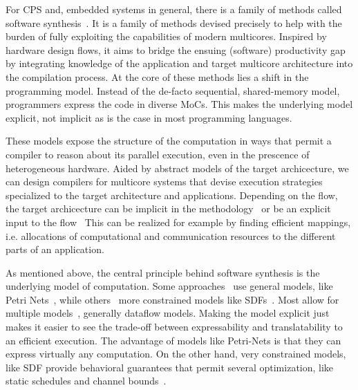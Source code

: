 For \ac{CPS} and, embedded systems in general, there is a family of methods called software synthesis~\cite{ritz1992softwaresynthesis,abbott1993softwaresynthesis,lin1998softwaresynthesis,bhartacharyya2000softwaresynthesis,pino1995softwaresynthesis,castrillon2011trends,bhattacharyya2012softwaresynthesis}.
It is a family of methods devised precisely to help with the burden of fully exploiting the capabilities of modern multicores.
Inspired by hardware design flows, it aims to bridge the ensuing (software) productivity gap by integrating knowledge of the application and target multicore architecture into the compilation process.
At the core of these methods lies a shift in the programming model.
Instead of the de-facto sequential, shared-memory model, programmers express the code in diverse \acp{MoC}.
This makes the underlying model explicit, not implicit as is the case in most programming languages.

These models expose the structure of the computation in ways that permit a compiler to reason about its parallel execution, even in the prescence of heterogeneous hardware.
Aided by abstract models of the target archicecture, we can design compilers for multicore systems that devise execution strategies specialized to the target architecture and applications.
Depending on the flow, the target archicecture can be implicit in the methodology~\cite{ritz1992softwaresynthesis} or be an explicit input to the flow~\cite{maps}
This can be realized for example by finding efficient mappings, i.e. allocations of computational and communication resources to the different parts of an application.

As mentioned above, the central principle behind software synthesis is the underlying model of computation. 
Some approaches~\cite{lin1998softwaresynthesis} use general models, like Petri Nets~\cite{petri1962nets}, while others~\cite{ritz1992softwaresynthesis} more constrained models like \acp{SDF}~\cite{lee1987sdf}.
Most allow for multiple models~\cite{bhartacharyya2000softwaresynthesis,pino1995softwaresynthesis,bhattacharyya2012softwaresynthesis}, generally dataflow models.
Making the model explicit just makes it easier to see the trade-off between expressability and translatability to an efficient execution.
The advantage of models like Petri-Nets is that they can express virtually any computation.
On the other hand, very constrained models, like \ac{SDF} provide behavioral guarantees that permit several optimization, like static schedules and channel bounds~\cite{Parks:M95/105}.

